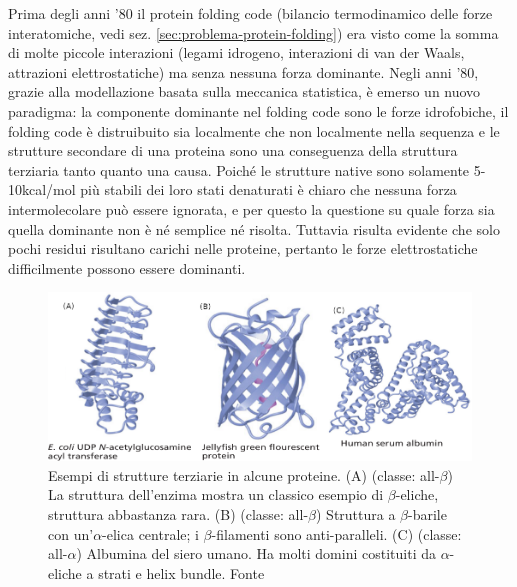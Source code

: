 {{\par Prima degli anni '80 il protein folding code (bilancio termodinamico delle forze interatomiche, vedi sez. \ref{sec:problema-protein-folding}) era visto come la somma di molte piccole interazioni (legami idrogeno, interazioni di van der Waals, attrazioni elettrostatiche) ma senza nessuna forza dominante\supercite{dill2008protein}. Negli anni '80, grazie alla modellazione basata sulla meccanica statistica, è emerso un nuovo paradigma: la componente dominante nel folding code sono le forze idrofobiche, il folding code è distruibuito sia localmente che non localmente nella sequenza e le strutture secondare di una proteina sono una conseguenza della struttura terziaria tanto quanto una causa. Poiché le strutture native sono solamente 5-10kcal/mol più stabili dei loro stati denaturati è chiaro che nessuna forza intermolecolare può essere ignorata, e per questo la questione su quale forza sia quella dominante non è né semplice né risolta. Tuttavia risulta evidente che solo pochi residui risultano carichi nelle proteine, pertanto le forze elettrostatiche difficilmente possono essere dominanti. 

\begin{figure}[!htb]
	\centering
	\includegraphics[scale=0.6]{images/strutture-proteine-complesse.png}
	\caption{Esempi di strutture terziarie in alcune proteine. (A) (classe: all-$\beta$) La struttura dell'enzima mostra un classico esempio di $\beta$-eliche, struttura abbastanza rara. (B) (classe: all-$\beta$) Struttura a $\beta$-barile con un'$\alpha$-elica centrale; i $\beta$-filamenti sono anti-paralleli. (C) (classe: all-$\alpha$)  Albumina del siero umano. Ha molti domini costituiti da $\alpha$-eliche a strati e helix bundle. Fonte \cite{moran2012principles}}
	\label{fig:strutture-complesse}
\end{figure}

}
}
